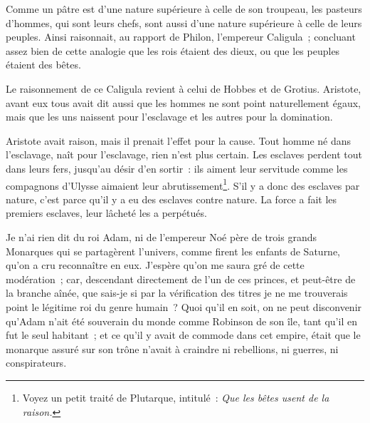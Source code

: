 \documentclass[french,twoside]{book} %
\begin{document}
Comme un pâtre est d’une nature supérieure à celle de son troupeau, les pasteurs d’hommes, qui sont leurs chefs, sont aussi d’une nature supérieure à celle de leurs peuples. Ainsi raisonnait, au rapport de Philon, l’empereur Caligula ; concluant assez bien de cette analogie que les rois étaient des dieux, ou que les peuples étaient des bêtes.\par
Le raisonnement de ce Caligula revient à celui de Hobbes et de Grotius. Aristote, avant eux tous avait dit aussi que les hommes ne sont point naturellement égaux, mais que les uns naissent pour l’esclavage et les autres pour la domination.\par
Aristote avait raison, mais il prenait l’effet pour la cause. Tout homme né dans l’esclavage, naît pour l’esclavage, rien n’est plus certain. Les esclaves perdent tout dans leurs fers, jusqu’au désir d’en sortir : ils aiment leur servitude comme les compagnons d’Ulysse aimaient leur abrutissement\footnote{Voyez un petit traité de Plutarque, intitulé : {\itshape Que les bêtes usent de la raison.}}. S’il y a donc des esclaves par nature, c’est parce qu’il y a eu des esclaves contre nature. La force a fait les premiers esclaves, leur lâcheté les a perpétués.\par
Je n’ai rien dit du roi Adam, ni de l’empereur Noé père de trois grands Monarques qui se partagèrent l’univers, comme firent les enfants de Saturne, qu’on a cru reconnaître en eux. J’espère qu’on me saura gré de cette modération ; car, descendant directement de l’un de ces princes, et peut-être de la branche aînée, que sais-je si par la vérification des titres je ne me trouverais point le légitime roi du genre humain ? Quoi qu’il en soit, on ne peut disconvenir qu’Adam n’ait été souverain du monde comme Robinson de son île, tant qu’il en fut le seul habitant ; et ce qu’il y avait de commode dans cet empire, était que le monarque assuré sur son trône n’avait à craindre ni rebellions, ni guerres, ni conspirateurs.
\end{document}
